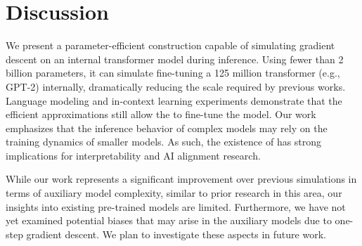 \section{Discussion}


We present a parameter-efficient construction \simulator{} capable of simulating gradient descent on an internal transformer model during inference. 
Using fewer than 2 billion parameters, it can simulate fine-tuning a 125 million transformer (e.g., GPT-2) internally, dramatically reducing the scale required by previous works. Language modeling and in-context learning experiments demonstrate that the efficient approximations still allow the \simulator{} to fine-tune the model. Our work emphasizes that the inference behavior of complex models may rely on the training dynamics of smaller models.
As such, the existence of \simulator{} has strong implications for interpretability and AI alignment research. 


While our work represents a significant improvement over previous simulations in terms of auxiliary model complexity, similar to prior research in this area, our insights into existing pre-trained models are limited. Furthermore, we have not yet examined potential biases that may arise in the auxiliary models due to one-step gradient descent. We plan to investigate these aspects in future work.

